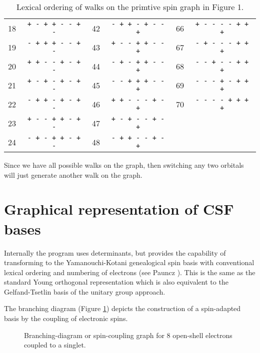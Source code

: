 \begin{table}[htbp]
\begin{tabular}{lc|lc|lc}
18 &  \verb=+ - + + - - + -= & 42  &  \verb=- + + - + - - +=    & 66 &
\verb=+ - - - - + + += \\
19 &  \verb=- + + + - - + -= & 43  &  \verb=+ - - + + - - +=    & 67 &
\verb=- + - - - + + += \\
20 &  \verb=+ + - - + - + -= & 44  &  \verb=- + - + + - - +=    & 68 &
\verb=- - + - - + + += \\
21 &  \verb=+ - + - + - + -= & 45  &  \verb=- - + + + - - +=    & 69 &
\verb=- - - + - + + += \\
22 &  \verb=- + + - + - + -= & 46  &  \verb=+ + - - - + - +=    & 70 &
\verb=- - - - + + + += \\
23 & \verb=+ - - + + - + -= & 47 & \verb=+ - + - - + - += & \\
24 & \verb=- + - + + - + -= & 48 & \verb=- + + - - + - += & \\ \hline
\end{tabular}

\caption{\label{mwalks} Lexical ordering of walks on the primtive spin
graph in Figure 1.}
\end{table}

Since we have all possible walks on the graph, then switching any two
orbitals will just generate another walk on the graph.

\section{Graphical representation of CSF bases}

Internally the program uses determinants, but provides the capability
of transforming to the Yamanouchi-Kotani \cite{kotani} genealogical
spin basis with conventional lexical ordering and numbering of
electrons (see Pauncz \cite{pauncz}).  This is the same as the
standard Young orthogonal representation which is also equivalent to
the Gelfand-Tsetlin basis of the unitary group approach.

The branching diagram (Figure \ref{sgraph}) depicts the construction
of a spin-adapted basis by the coupling of electronic spins.

\begin{figure}[htbp]

\center

\centerline{}
\caption{\label{sgraph} Branching-diagram or spin-coupling graph for 8
open-shell electrons coupled to a singlet.}
\end{figure}

